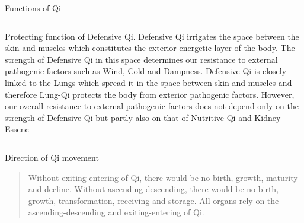 \documentclass[
	11pt, %
]{beamer}
\theoremstyle{newblock}
\begin{document}
\begin{frame}{Functions of Qi}
\begin{columns}[T]
{\begin{block}{Protecting}
{				function of Defensive Qi. Defensive Qi irrigates the
				space between the skin and muscles which constitutes
				the exterior energetic layer of the body. The strength of
				Defensive Qi in this space determines our resistance to
				external pathogenic factors such as Wind, Cold and
				Dampness. Defensive Qi is closely linked to the Lungs
				which spread it in the space between skin and muscles
				and therefore Lung-Qi protects the body from exterior
				pathogenic factors.
				However, our overall resistance to external pathogenic factors does not depend only on the strength of
				Defensive Qi but partly also on that of Nutritive Qi and
				Kidney-Essenc}
			\end{block}
		}
	\end{columns}
\end{frame}
\begin{frame}[plain]
	\Huge{Direction of Qi movement}\\
	\normalsize{
	\begin{quote}
		Without exiting-entering of Qi, there  would be no birth, growth, maturity and decline. Without ascending-descending, there would be no birth, growth, transformation, receiving and storage. All organs rely on the ascending-descending and exiting-entering of Qi.
	\end{quote}
	}
\end{frame}
\end{document}
